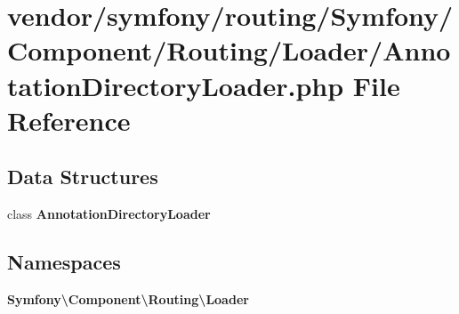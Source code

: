 \section{vendor/symfony/routing/\+Symfony/\+Component/\+Routing/\+Loader/\+Annotation\+Directory\+Loader.php File Reference}
\label{_annotation_directory_loader_8php}
\subsection*{Data Structures}
\begin{DoxyCompactItemize}
\item 
class {\bf Annotation\+Directory\+Loader}
\end{DoxyCompactItemize}
\subsection*{Namespaces}
\begin{DoxyCompactItemize}
\item 
 {\bf Symfony\textbackslash{}\+Component\textbackslash{}\+Routing\textbackslash{}\+Loader}
\end{DoxyCompactItemize}
